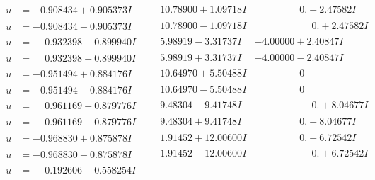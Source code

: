 \documentclass[1p]{elsarticle_modified}
\theoremstyle{definition}
\begin{document}
$$\begin{array}{c|c|c}
\begin{aligned}
u &= -0.908434 + 0.905373 I\end{aligned}
 & \phantom{-}10.78900 + 1.09718 I & \phantom{-0.000000 } 0. - 2.47582 I \\ \hline\begin{aligned}
u &= -0.908434 - 0.905373 I\end{aligned}
 & \phantom{-}10.78900 - 1.09718 I & \phantom{-0.000000 -}0. + 2.47582 I \\ \hline\begin{aligned}
u &= \phantom{-}0.932398 + 0.899940 I\end{aligned}
 & \phantom{-}5.98919 - 3.31737 I & -4.00000 + 2.40847 I \\ \hline\begin{aligned}
u &= \phantom{-}0.932398 - 0.899940 I\end{aligned}
 & \phantom{-}5.98919 + 3.31737 I & -4.00000 - 2.40847 I \\ \hline\begin{aligned}
u &= -0.951494 + 0.884176 I\end{aligned}
 & \phantom{-}10.64970 + 5.50488 I & \phantom{-0.000000 } 0 \\ \hline\begin{aligned}
u &= -0.951494 - 0.884176 I\end{aligned}
 & \phantom{-}10.64970 - 5.50488 I & \phantom{-0.000000 } 0 \\ \hline\begin{aligned}
u &= \phantom{-}0.961169 + 0.879776 I\end{aligned}
 & \phantom{-}9.48304 - 9.41748 I & \phantom{-0.000000 -}0. + 8.04677 I \\ \hline\begin{aligned}
u &= \phantom{-}0.961169 - 0.879776 I\end{aligned}
 & \phantom{-}9.48304 + 9.41748 I & \phantom{-0.000000 } 0. - 8.04677 I \\ \hline\begin{aligned}
u &= -0.968830 + 0.875878 I\end{aligned}
 & \phantom{-}1.91452 + 12.00600 I & \phantom{-0.000000 } 0. - 6.72542 I \\ \hline\begin{aligned}
u &= -0.968830 - 0.875878 I\end{aligned}
 & \phantom{-}1.91452 - 12.00600 I & \phantom{-0.000000 -}0. + 6.72542 I \\ \hline\begin{aligned}
u &= \phantom{-}0.192606 + 0.558254 I\end{aligned}

\end{array}$$
\end{document}
